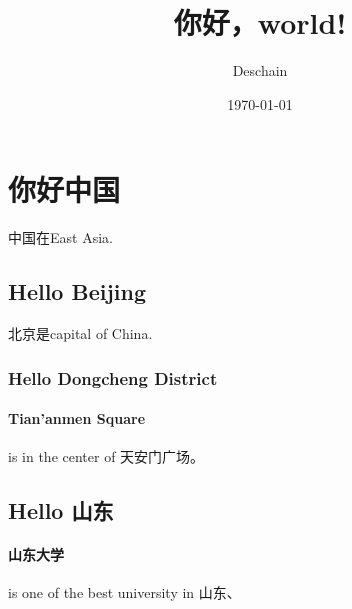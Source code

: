 \documentclass[UTF8]{ctexart}
\title{你好，world!}
\author{Deschain}
\date{\today}
\begin{document}
\maketitle
\section{你好中国}
中国在East Asia.
\subsection{Hello Beijing}
北京是capital of China.
\subsubsection{Hello Dongcheng District}
\paragraph{Tian'anmen Square}
is in the center of 天安门广场。
\subsection{Hello 山东}
\paragraph{山东大学}is one of the best university in 山东、
\end{document}
